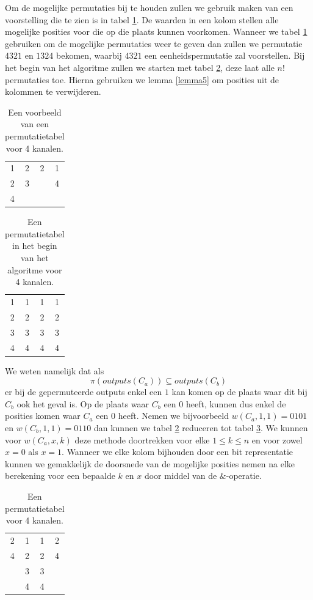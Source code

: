 \documentclass{article}
\begin{document}
Om de mogelijke permutaties bij te houden zullen we gebruik maken van een voorstelling die te zien is in tabel \ref{tabel4}.
De waarden in een kolom stellen alle mogelijke posities voor die op die plaats kunnen voorkomen.
Wanneer we tabel  \ref{tabel4} gebruiken om de mogelijke permutaties weer te geven dan zullen we permutatie $4321$ en $1324$  bekomen, waarbij $4321$ een eenheidspermutatie zal voorstellen.
Bij het begin van het algoritme zullen we starten met tabel \ref{tabel5}, deze laat alle $n!$ permutaties toe.
Hierna gebruiken we lemma \ref{lemma5} om posities uit de kolommen te verwijderen.
\begin{table}[!h]
	\centering
	\begin{tabular}{|c|c|c|c|}
	\hline
	1 & 2 & 2 & 1 \\ 
	2 & 3 &  &  4\\ 
	4 &  &  &  \\ 
	\hline 
	\end{tabular}
	\caption{Een voorbeeld van een permutatietabel voor 4 kanalen.}
	\label{tabel4}
\end{table}
\begin{table}[!h]
	\centering
	\begin{tabular}{|c|c|c|c|}
	\hline
	1 & 1 & 1 & 1 \\ 
	2 & 2 & 2 & 2\\ 
	3 & 3 & 3 & 3 \\
	4 & 4 & 4 & 4\\ 
	\hline 
	\end{tabular}
	\caption{Een permutatietabel in het begin van het algoritme voor 4 kanalen.}
\label{tabel5}
\end{table}

We weten namelijk dat als \[{\pi\left(outputs\left(C_a\right)\right) \subseteq outputs\left(C_b\right)}\] er bij de gepermuteerde outputs enkel een $1$ kan komen op de plaats waar dit bij $C_b$ ook het geval is.
Op de plaats waar $C_b$ een $0$ heeft, kunnen dus enkel de posities komen waar $C_a$ een $0$ heeft.
Nemen we bijvoorbeeld $w\left(C_a,1,1\right) = 0101$ en ${w\left(C_b,1,1\right)=0110}$ dan kunnen we tabel \ref{tabel5} reduceren tot tabel \ref{tabel6}.
We kunnen voor $w\left(C_a, x, k\right)$ deze methode doortrekken voor elke $1 \leq k \leq n$ en voor zowel $x = 0$ als $x = 1$.
Wanneer we elke kolom bijhouden door een bit representatie kunnen we gemakkelijk de doorsnede van de mogelijke posities nemen na elke berekening voor een bepaalde $k$ en $x$ door middel van de $\&$-operatie. 
\begin{table}[!h]
	\centering
	\begin{tabular}{|c|c|c|c|}
	\hline
	2 & 1 & 1 & 2 \\ 
	4 & 2 & 2 & 4\\ 
	 & 3 & 3 &  \\
	 & 4 & 4 & \\ 
	\hline 
	\end{tabular}
	\caption{Een permutatietabel voor 4 kanalen.}
	\label{tabel6}
\end{table}
\end{document}

